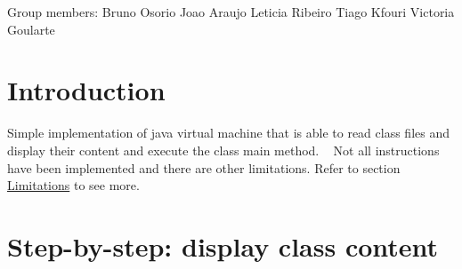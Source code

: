 
\begin{DoxyPre}
Group members:
    Bruno Osorio
    Joao Araujo
    Leticia Ribeiro
    Tiago Kfouri
    Victoria Goularte
\end{DoxyPre}
\hypertarget{index_intro}{}\section{Introduction}\label{index_intro}
Simple implementation of java virtual machine that is able to read class files and display their content and execute the class\textquotesingle{} main method. ~\newline
 Not all instructions have been implemented and there are other limitations. Refer to section \hyperlink{index_limitations}{Limitations} to see more. ~\newline
\hypertarget{index_stepguideJavaClass}{}\section{Step-\/by-\/step\+: display class content}\label{index_stepguideJavaClass}

